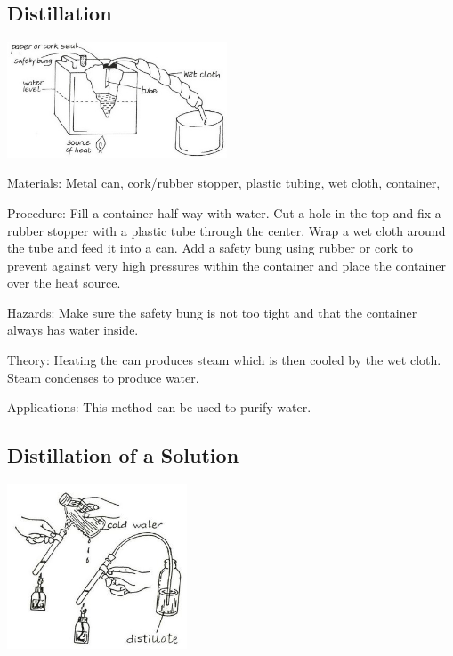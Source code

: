\begin{multicols}{2}
\subsection{Distillation}

\begin{center}
\includegraphics[width=0.49\textwidth]{./img/vso/distillation.jpg}
\end{center}

\begin{description*}
\item[Materials:]{Metal can, cork/rubber stopper, plastic tubing, wet cloth, container, }
\item[Procedure:]{Fill a container half way with water. Cut a hole in the top and fix a rubber stopper with a plastic tube through the center. Wrap a wet cloth around the tube and feed it into a can. Add a safety bung using rubber or cork to prevent against very high pressures within the container and place the container over the heat source.}
\item[Hazards:]{Make sure the safety bung is not too tight and that the container always has water inside.}
\item[Theory:]{Heating the can produces steam which is then cooled by the wet cloth. Steam condenses to produce water.}
\item[Applications:]{This method can be used to purify water.}
\end{description*}

\columnbreak

\subsection{Distillation of a Solution}

\begin{center}
\includegraphics[width=0.4\textwidth]{./img/source/distillation-solution.jpg}
\end{center}


\end{multicols}
